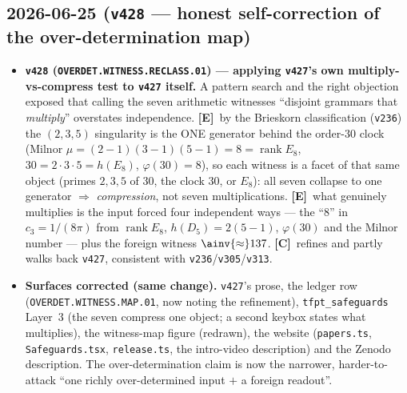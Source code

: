\documentclass[11pt]{article}
\providecommand{\mE}{\textbf{[E]}}\providecommand{\mC}{\textbf{[C]}}
\providecommand{\vref}[1]{\texttt{#1}}
\providecommand{\cthree}{c_3}\providecommand{\phiz}{\varphi_0^{\mathrm{ret}}}
\begin{document}
\subsection*{2026-06-25 (\texttt{v428} --- honest self-correction of the over-determination map)}
\begin{itemize}
\item \textbf{\texttt{v428} (\texttt{OVERDET.WITNESS.RECLASS.01}) --- applying \texttt{v427}'s own
multiply-vs-compress test to \texttt{v427} itself.} A pattern search and the right objection exposed that
calling the seven arithmetic witnesses ``disjoint grammars that \emph{multiply}'' overstates independence.
\mE\ by the Brieskorn classification (\vref{v236}) the $(2,3,5)$ singularity is the ONE generator behind the
order-$30$ clock (Milnor $\mu{=}(2{-}1)(3{-}1)(5{-}1){=}8{=}\operatorname{rank}E_8$, $30{=}2{\cdot}3{\cdot}5
{=}h(E_8)$, $\varphi(30){=}8$), so each witness is a facet of that same object (primes $2,3,5$ of $30$, the
clock $30$, or $E_8$): all seven collapse to one generator $\Rightarrow$ \emph{compression}, not seven
multiplications. \mE\ what genuinely multiplies is the input forced four independent ways --- the ``$8$'' in
$\cthree{=}1/(8\pi)$ from $\operatorname{rank}E_8$, $h(D_5){=}2(5{-}1)$, $\varphi(30)$ and the Milnor number
--- plus the foreign witness $\ainv{\approx}137$. \mC\ refines and partly walks back \texttt{v427},
consistent with \vref{v236}/\vref{v305}/\vref{v313}.
\item \textbf{Surfaces corrected (same change).} \texttt{v427}'s prose, the ledger row
(\texttt{OVERDET.WITNESS.MAP.01}, now noting the refinement), \texttt{tfpt\_safeguards} Layer~3 (the seven
compress one object; a second keybox states what multiplies), the witness-map figure (redrawn), the website
(\texttt{papers.ts}, \texttt{Safeguards.tsx}, \texttt{release.ts}, the intro-video description) and the
Zenodo description. The over-determination claim is now the narrower, harder-to-attack ``one richly
over-determined input $+$ a foreign readout''.
\end{itemize}
\end{document}
